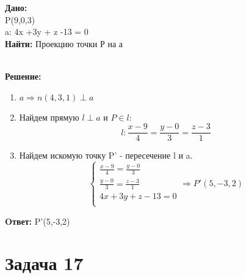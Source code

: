 \documentclass{article}
\begin{document}
\begin{minipage}[t]{0.45\textwidth}

\textbf{Дано:}\\ 
P(9,0,3)\\ 
a: 4x +3y + z -13 = 0\\ 
\textbf{Найти: }Проекцию точки Р на а
\end{minipage}
\begin{minipage}[t]{0.45\textwidth}
  \vspace{-\baselineskip} %

\begin{center}
\end{center}
\end{minipage}
\\
\textbf{Решение:}
\begin{enumerate}
  \item $ a \Rightarrow n(4,3,1) \perp a$ 
  \item Найдем прямую $l \perp a $ и $ P \in l $:
    \[
      l: \frac{x-9}{4} = \frac{y-0}{3} = \frac{z-3}{1}
    \]
  \item Найдем искомую точку P' - пересечение l и a. 
    \[
      \begin{cases}
        \frac{x-9}{4} = \frac{y-0}{3} \\ 
 \frac{y-0}{3} = \frac{z-3}{1}\\
 4x +3y + z -13 = 0\\ 
      \end{cases}
      \Rightarrow P'(5,-3,2)
    \]
\end{enumerate}

\textbf{Oтвет: } P'(5,-3,2)
\section*{Задача 17}
\end{document}
